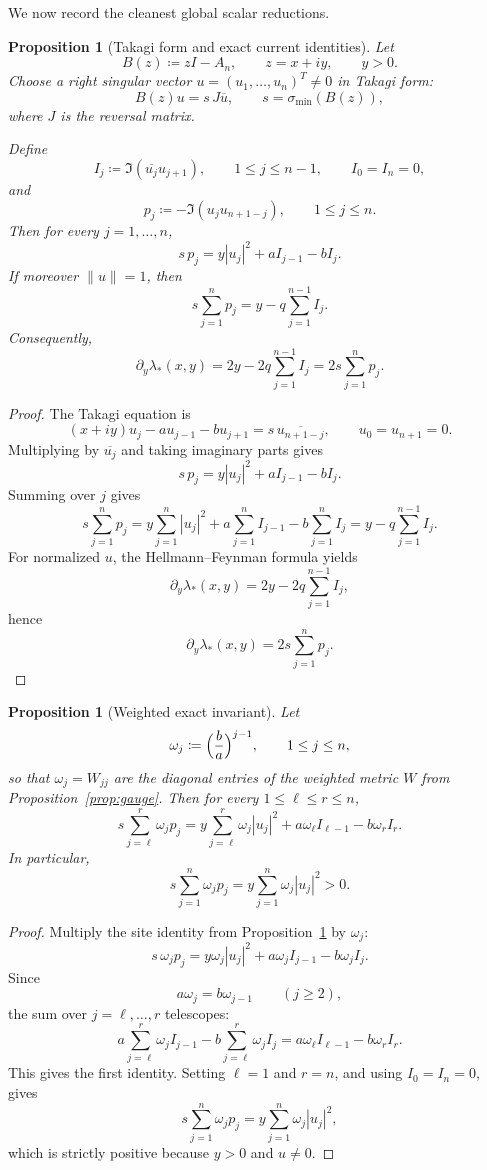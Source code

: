 \documentclass[11pt]{article}
\newtheorem{proposition}[theorem]{Proposition}
\begin{document}
We now record the cleanest global scalar reductions.

\begin{proposition}[Takagi form and exact current identities]\label{prop:Takagi}
Let
\[
B(z)\coloneqq zI-A_n,
\qquad
z=x+iy,
\qquad
y>0.
\]
Choose a right singular vector \(u=(u_1,\dots,u_n)^T\neq 0\) in Takagi form:
\[
B(z)u=s\,J\overline{u},
\qquad
s=\sigma_{\min}(B(z)),
\]
where \(J\) is the reversal matrix.

Define
\[
I_j\coloneqq \Im(\overline{u_j}u_{j+1}),
\qquad
1\le j\le n-1,
\qquad
I_0=I_n=0,
\]
and
\[
p_j\coloneqq -\Im(u_j u_{n+1-j}),
\qquad
1\le j\le n.
\]
Then for every \(j=1,\dots,n\),
\[
s\,p_j
=
y|u_j|^2+a I_{j-1}-b I_j.
\]
If moreover \(\|u\|=1\), then
\[
s\sum_{j=1}^n p_j
=
y-q\sum_{j=1}^{n-1} I_j.
\]
Consequently,
\[
\partial_y \lambda_*(x,y)
=
2y-2q\sum_{j=1}^{n-1} I_j
=
2s\sum_{j=1}^n p_j.
\]
\end{proposition}

\begin{proof}
The Takagi equation is
\[
(x+iy)u_j-a u_{j-1}-b u_{j+1}=s\,\overline{u_{n+1-j}},
\qquad
u_0=u_{n+1}=0.
\]
Multiplying by \(\overline{u_j}\) and taking imaginary parts gives
\[
s\,p_j=y|u_j|^2+a I_{j-1}-b I_j.
\]
Summing over \(j\) gives
\[
s\sum_{j=1}^n p_j
=
y\sum_{j=1}^n |u_j|^2
+a\sum_{j=1}^n I_{j-1}
-b\sum_{j=1}^n I_j
=
y-q\sum_{j=1}^{n-1} I_j.
\]
For normalized \(u\), the Hellmann--Feynman formula yields
\[
\partial_y \lambda_*(x,y)=2y-2q\sum_{j=1}^{n-1} I_j,
\]
hence
\[
\partial_y \lambda_*(x,y)=2s\sum_{j=1}^n p_j.
\]
\end{proof}

\begin{proposition}[Weighted exact invariant]\label{prop:weighted}
Let
\[
\omega_j\coloneqq \Bigl(\frac ba\Bigr)^{j-1},
\qquad
1\le j\le n,
\]
so that \(\omega_j=W_{jj}\) are the diagonal entries of the weighted metric \(W\) from
Proposition~\ref{prop:gauge}. Then for every \(1\le \ell\le r\le n\),
\[
s\sum_{j=\ell}^r \omega_j p_j
=
y\sum_{j=\ell}^r \omega_j |u_j|^2
+
a\omega_\ell I_{\ell-1}
-
b\omega_r I_r.
\]
In particular,
\[
s\sum_{j=1}^n \omega_j p_j
=
y\sum_{j=1}^n \omega_j |u_j|^2
>0.
\]
\end{proposition}

\begin{proof}
Multiply the site identity from Proposition~\ref{prop:Takagi} by \(\omega_j\):
\[
s\,\omega_j p_j
=
y\omega_j |u_j|^2
+
a\omega_j I_{j-1}
-
b\omega_j I_j.
\]
Since
\[
a\omega_j=b\omega_{j-1}
\qquad (j\ge 2),
\]
the sum over \(j=\ell,\dots,r\) telescopes:
\[
a\sum_{j=\ell}^r \omega_j I_{j-1}
-
b\sum_{j=\ell}^r \omega_j I_j
=
a\omega_\ell I_{\ell-1}
-
b\omega_r I_r.
\]
This gives the first identity. Setting \(\ell=1\) and \(r=n\), and using \(I_0=I_n=0\), gives
\[
s\sum_{j=1}^n \omega_j p_j
=
y\sum_{j=1}^n \omega_j |u_j|^2,
\]
which is strictly positive because \(y>0\) and \(u\neq 0\).
\end{proof}
\end{document}
